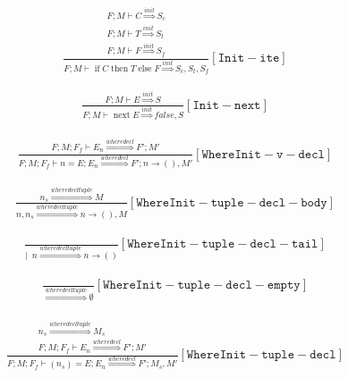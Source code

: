 \documentclass{scrartcl}
\DeclareMathOperator{\ifop}{if}
\DeclareMathOperator{\thenop}{then}
\DeclareMathOperator{\elseop}{else}
\DeclareMathOperator{\nextop}{next}
\begin{document}
    \begin{align*}
    \frac{
        \begin{matrix}
        F; M \vdash C \overset{init}{\Rightarrow} S_c \\
        F; M \vdash T \overset{init}{\Rightarrow} S_t \\
        F; M \vdash F \overset{init}{\Rightarrow} S_f
        \end{matrix}
    }{
        F; M \vdash \ifop C \thenop T \elseop F \overset{init}{\Rightarrow} S_c, S_t, S_f
    }[\mathtt{Init-ite}]
    \end{align*}
    
    \begin{align*}
    \frac{
        F; M \vdash E \overset{init}{\Rightarrow} S
    }{
        F; M \vdash \nextop E \overset{init}{\Rightarrow} false, S
    }[\mathtt{Init-next}]
    \end{align*}
    
    \begin{align*}
    \frac{
        \begin{matrix}
        F; M; F_f \vdash E_n \overset{wheredecl}{\Rightarrow} F'; M'
        \end{matrix}
    }{
        F; M; F_f \vdash n = E; E_n \overset{wheredecl}{\Rightarrow} F'; n \to (), M'
    }[\mathtt{WhereInit-v-decl}]
    \end{align*}
    
    \begin{align*}
    \frac{
        n_s \overset{wheredecltuple}{\Rightarrow} M
    }{
        n, n_s \overset{wheredecltuple}{\Rightarrow} n \to (), M
    }[\mathtt{WhereInit-tuple-decl-body}]
    \end{align*}
    
    \begin{align*}
    \frac{}{
        | \enspace n \overset{wheredecltuple}{\Rightarrow} n \to ()
    }[\mathtt{WhereInit-tuple-decl-tail}]
    \end{align*}
    
    \begin{align*}
    \frac{}{
        \overset{wheredecltuple}{\Rightarrow} \emptyset
    }[\mathtt{WhereInit-tuple-decl-empty}]
    \end{align*}
    
    \begin{align*}
    \frac{
        \begin{matrix}
        n_s \overset{wheredecltuple}{\Rightarrow} M_s \\
        F; M; F_f \vdash E_n \overset{wheredecl}{\Rightarrow} F'; M'
        \end{matrix}
    }{
        F; M; F_f \vdash ( n_s ) = E; E_n \overset{wheredecl}{\Rightarrow} F'; M_s, M'
    }[\mathtt{WhereInit-tuple-decl}]
    \end{align*}
    
\end{document}
